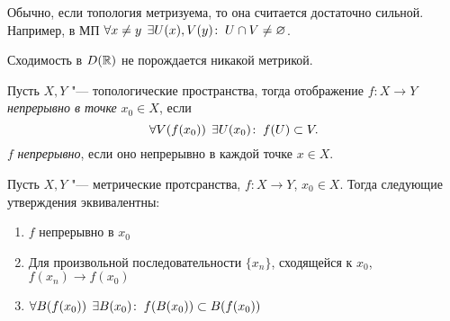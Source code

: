 \documentclass[main]{subfiles}
\begin{document}
\begin{remark}
  Обычно, если топология метризуема,
  то она считается достаточно сильной.
  Например, в МП \( \forall {x \ne y} \; \,
  \exists U(x), V(y) \colon \: U \cap V \ne \varnothing \).
\end{remark}

\begin{exercise} %
  Сходимость в \( D(\mathbb{R}) \) не порождается никакой метрикой.
\end{exercise}

\begin{definition}
  Пусть \( X, Y \) "--- топологические пространства,
  тогда отображение \( f : X \to Y \)
  \emph{непрерывно в точке} \( x_0 \in X \),
  если
  \[
    \forall {V(f(x_0))} \; \, \exists U(x_0) \colon \: f(U) \subset V.
  \]
  \( f \) \emph{непрерывно},
  если оно непрерывно в каждой точке \( x \in X \).
\end{definition}

\begin{exercise}
  Пусть \( X, Y \) "--- метрические протсранства,
  \( f : X \to Y \), \( x_0 \in X \).
  Тогда следующие утверждения эквивалентны:
  \begin{enumerate}
    \item \( f \) непрерывно в \( x_0 \)
    \item Для произвольной последовательности
      \( \{ x_n \} \), сходящейся к \( x_0 \),
      \( f(x_n) \to f(x_0) \)
    \item \( \forall {B(f(x_0))} \; \, \exists B(x_0) \colon \:
      f(B(x_0)) \subset B(f(x_0)) \)
  \end{enumerate}
\end{exercise}
\end{document}
